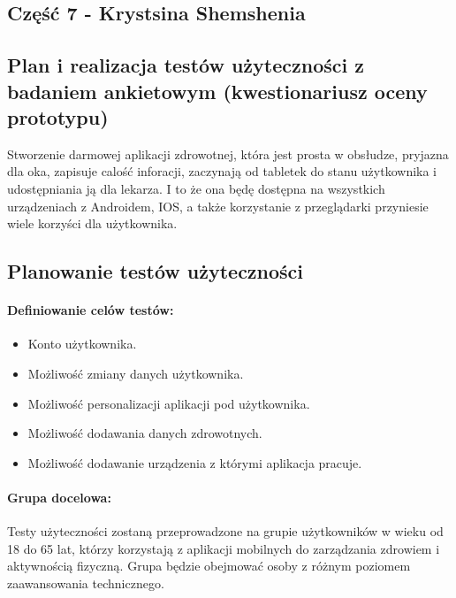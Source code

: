 \begin{center}
  \section{Część 7 - Krystsina Shemshenia}
  \subsection{Plan i realizacja testów użyteczności z badaniem ankietowym (kwestionariusz oceny prototypu)}
\end{center}

\quad Stworzenie darmowej aplikacji zdrowotnej, która jest prosta w obsłudze, pryjazna dla oka, zapisuje calość inforacji, zaczynają od tabletek do stanu użytkownika i udostępniania ją dla lekarza. I to że ona będę dostępna na wszystkich urządzeniach z Androidem, IOS, a także korzystanie z przeglądarki przyniesie wiele korzyści dla użytkownika.

\begin{center}
  \subsection{Planowanie testów użyteczności}
\end{center}

\paragraph{Deﬁniowanie celów testów:} 
\begin{itemize}
  \item Konto użytkownika.
  \item Możliwość zmiany danych użytkownika.
  \item Możliwość personalizacji aplikacji pod użytkownika.
  \item Możliwość dodawania danych zdrowotnych.
  \item Możliwość dodawanie urządzenia z którymi aplikacja pracuje.
\end{itemize}

\paragraph{Grupa docelowa:} Testy użyteczności zostaną przeprowadzone na grupie użytkowników w wieku od 18 do 65 lat, którzy korzystają z aplikacji mobilnych do zarządzania zdrowiem i aktywnością ﬁzyczną. Grupa będzie obejmować osoby z różnym poziomem zaawansowania technicznego.


